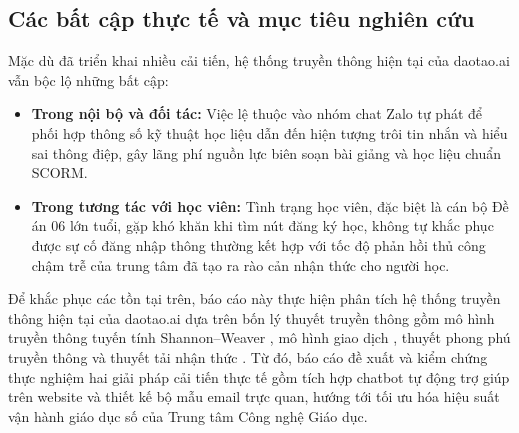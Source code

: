 \subsection{Các bất cập thực tế và mục tiêu nghiên cứu}

Mặc dù đã triển khai nhiều cải tiến, hệ thống truyền thông hiện tại của daotao.ai vẫn bộc lộ những bất cập:
\begin{itemize}
    \item \textbf{Trong nội bộ và đối tác:} Việc lệ thuộc vào nhóm chat Zalo tự phát để phối hợp thông số kỹ thuật học liệu dẫn đến hiện tượng trôi tin nhắn và hiểu sai thông điệp, gây lãng phí nguồn lực biên soạn bài giảng và học liệu chuẩn SCORM.
    \item \textbf{Trong tương tác với học viên:} Tình trạng học viên, đặc biệt là cán bộ Đề án 06 lớn tuổi, gặp khó khăn khi tìm nút đăng ký học, không tự khắc phục được sự cố đăng nhập thông thường kết hợp với tốc độ phản hồi thủ công chậm trễ của trung tâm đã tạo ra rào cản nhận thức cho người học.
\end{itemize}

Để khắc phục các tồn tại trên, báo cáo này thực hiện phân tích hệ thống truyền thông hiện tại của daotao.ai dựa trên bốn lý thuyết truyền thông gồm mô hình truyền thông tuyến tính Shannon--Weaver \parencite{shannon1949}, mô hình giao dịch \parencite{barnlund2008}, thuyết phong phú truyền thông \parencite{daft1986} và thuyết tải nhận thức \parencite{sweller1988}. Từ đó, báo cáo đề xuất và kiểm chứng thực nghiệm hai giải pháp cải tiến thực tế gồm tích hợp chatbot tự động trợ giúp trên website và thiết kế bộ mẫu email trực quan, hướng tới tối ưu hóa hiệu suất vận hành giáo dục số của Trung tâm Công nghệ Giáo dục.
